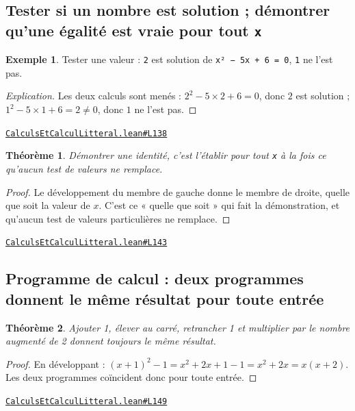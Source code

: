 \documentclass[11pt,a4paper]{article}
\theoremstyle{definition}
\newtheorem{exemple}{Exemple}
\theoremstyle{plain}
\newtheorem{theoreme}{Théorème}
\newenvironment{explication}{\begin{proof}[Explication]}{\end{proof}}
\newcommand{\source}[2]{\par\smallskip\noindent\hfill{\footnotesize\href{#1}{\texttt{#2}}}\par\smallskip}
\begin{document}
\subsection{Tester si un nombre est solution ; démontrer qu'une égalité est vraie pour tout \texttt{x}}

\begin{exemple}
Tester une valeur : \texttt{2} est solution de \texttt{x² − 5x + 6 = 0}, \texttt{1} ne l'est pas.
\end{exemple}

\begin{explication}
Les deux calculs sont menés : $2^2 - 5 \times 2 + 6 = 0$, donc $2$ est solution ;
$1^2 - 5 \times 1 + 6 = 2 \ne 0$, donc $1$ ne l'est pas.
\end{explication}
\source{https://github.com/Commutator-IO/learn-lean/blob/main/courses/01-college/01-nombres-et-calculs/CalculsEtCalculLitteral.lean\#L138}{CalculsEtCalculLitteral.lean\#L138}

\begin{theoreme}
Démontrer une identité, c'est l'établir pour tout \texttt{x} à la fois \textemdash{} ce qu'aucun test de
valeurs ne remplace.
\end{theoreme}

\begin{proof}
Le développement du membre de gauche donne le membre de droite, quelle que soit la
valeur de $x$. C'est ce « quelle que soit » qui fait la démonstration, et qu'aucun test de
valeurs particulières ne remplace.
\end{proof}
\source{https://github.com/Commutator-IO/learn-lean/blob/main/courses/01-college/01-nombres-et-calculs/CalculsEtCalculLitteral.lean\#L143}{CalculsEtCalculLitteral.lean\#L143}

\subsection{Programme de calcul : deux programmes donnent le même résultat pour toute entrée}

\begin{theoreme}
\og{} Ajouter 1, élever au carré, retrancher 1 \fg{} et \og{} multiplier par le nombre augmenté
de 2 \fg{} donnent toujours le même résultat.
\end{theoreme}

\begin{proof}
En développant : $(x+1)^2 - 1 = x^2 + 2x + 1 - 1 = x^2 + 2x = x(x+2)$. Les deux
programmes coïncident donc pour toute entrée.
\end{proof}
\source{https://github.com/Commutator-IO/learn-lean/blob/main/courses/01-college/01-nombres-et-calculs/CalculsEtCalculLitteral.lean\#L149}{CalculsEtCalculLitteral.lean\#L149}
\end{document}
